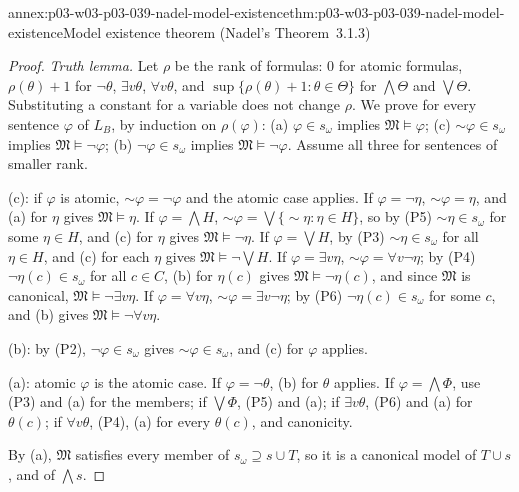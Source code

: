 \begin{annexitem}{annex:p03-w03-p03-039-nadel-model-existence}{thm:p03-w03-p03-039-nadel-model-existence}{Model existence theorem (Nadel's Theorem~3.1.3)}
\begin{proof}
\emph{Truth lemma.} Let \(\rho\) be the rank of formulas: \(0\) for atomic
formulas, \(\rho(\theta)+1\) for \(\neg\theta\), \(\exists v\theta\),
\(\forall v\theta\), and \(\sup\{\rho(\theta)+1:\theta\in\Theta\}\) for
\(\bigwedge\Theta\) and \(\bigvee\Theta\). Substituting a constant for a
variable does not change \(\rho\). We prove for every sentence \(\varphi\) of
\(L_B\), by induction on \(\rho(\varphi)\):
(a) \(\varphi\in s_\omega\) implies \(\mathfrak M\models\varphi\);
(c) \({\sim}\varphi\in s_\omega\) implies \(\mathfrak M\models\neg\varphi\);
(b) \(\neg\varphi\in s_\omega\) implies \(\mathfrak M\models\neg\varphi\).
Assume all three for sentences of smaller rank.

(c): if \(\varphi\) is atomic, \({\sim}\varphi=\neg\varphi\) and the atomic case
applies. If \(\varphi=\neg\eta\), \({\sim}\varphi=\eta\), and (a) for \(\eta\)
gives \(\mathfrak M\models\eta\). If \(\varphi=\bigwedge H\),
\({\sim}\varphi=\bigvee\{{\sim}\eta:\eta\in H\}\), so by (P5)
\({\sim}\eta\in s_\omega\) for some \(\eta\in H\), and (c) for \(\eta\) gives
\(\mathfrak M\models\neg\eta\). If \(\varphi=\bigvee H\), by (P3)
\({\sim}\eta\in s_\omega\) for all \(\eta\in H\), and (c) for each \(\eta\)
gives \(\mathfrak M\models\neg\bigvee H\). If \(\varphi=\exists v\eta\),
\({\sim}\varphi=\forall v\neg\eta\); by (P4) \(\neg\eta(c)\in s_\omega\) for
all \(c\in C\), (b) for \(\eta(c)\) gives \(\mathfrak M\models\neg\eta(c)\), and
since \(\mathfrak M\) is canonical, \(\mathfrak M\models\neg\exists v\eta\). If
\(\varphi=\forall v\eta\), \({\sim}\varphi=\exists v\neg\eta\); by (P6)
\(\neg\eta(c)\in s_\omega\) for some \(c\), and (b) gives
\(\mathfrak M\models\neg\forall v\eta\).

(b): by (P2), \(\neg\varphi\in s_\omega\) gives \({\sim}\varphi\in s_\omega\),
and (c) for \(\varphi\) applies.

(a): atomic \(\varphi\) is the atomic case. If \(\varphi=\neg\theta\), (b) for
\(\theta\) applies. If \(\varphi=\bigwedge\Phi\), use (P3) and (a) for the
members; if \(\bigvee\Phi\), (P5) and (a); if \(\exists v\theta\), (P6) and
(a) for \(\theta(c)\); if \(\forall v\theta\), (P4), (a) for every
\(\theta(c)\), and canonicity.

By (a), \(\mathfrak M\) satisfies every member of \(s_\omega\supseteq s\cup T\),
so it is a canonical model of \(T\cup s\), and of \(\bigwedge s\).
\end{proof}
\end{annexitem}

